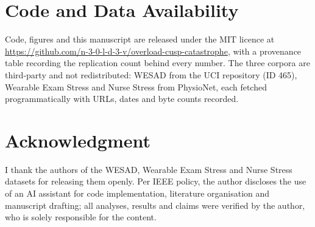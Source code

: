 \documentclass[conference]{IEEEtran}
\begin{document}
\section*{Code and Data Availability}
Code, figures and this manuscript are released under the MIT licence at
\url{https://github.com/n-3-0-l-d-3-v/overload-cusp-catastrophe}, with a
provenance table recording the replication count behind every number. The three
corpora are third-party and not redistributed: WESAD from the UCI repository
(ID 465), Wearable Exam Stress and Nurse Stress from PhysioNet, each fetched
programmatically with URLs, dates and byte counts recorded.

\section*{Acknowledgment}
I thank the authors of the WESAD, Wearable Exam Stress and Nurse Stress
datasets for releasing them openly. Per IEEE policy, the author discloses the
use of an AI assistant for code implementation, literature organisation and
manuscript drafting; all analyses, results and claims were verified by the
author, who is solely responsible for the content.



\end{document}
